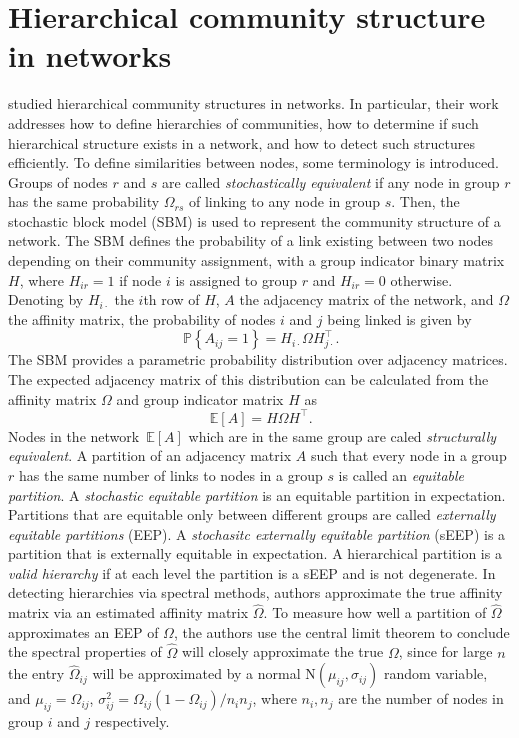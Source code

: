 \documentclass[letterpaper, 10 pt, conference]{article}
\newcommand\pr[1]{\, \mathbb{P} \left\lbrace #1 \right\rbrace}
\newcommand\expec[1]{\, \mathbb{E} \left\lbrack #1 \right\rbrack}
\begin{document}
\section{Hierarchical community structure in networks}\label{section:community}
\citet{schaub2020hierarchical} studied hierarchical community structures in networks. In particular, their work addresses how to define hierarchies of communities, how to determine if such hierarchical structure exists in a network, and how to detect such structures efficiently. To define similarities between nodes, some terminology is introduced. Groups of nodes $r$ and $s$ are called \textit{stochastically equivalent} if any node in group $r$ has the same probability $\Omega_{rs}$ of linking to any node in group $s$. Then, the stochastic block model (SBM) is used to represent the community structure of a network. The SBM defines the probability of a link existing between two nodes depending on their community assignment, with a group indicator binary matrix $H$, where $H_{ir} = 1$ if node $i$ is assigned to group $r$ and $H_{ir} = 0$ otherwise. Denoting by $H_{i \cdot}$ the $i$th row of $H$, $A$ the adjacency matrix of the network, and $\Omega$ the affinity matrix,  the probability of nodes $i$ and $j$ being linked is given by 
\begin{equation}
\pr{A_{ij} = 1} = H_{i \cdot} \Omega H_{j \cdot}^{\top}.
\end{equation}
The SBM provides a parametric probability distribution over adjacency matrices. The expected adjacency matrix of this distribution can be calculated from the affinity matrix $\Omega$ and group indicator matrix $H$ as 
\begin{equation}
	\expec{A} = H \Omega H^\top.
\end{equation}
Nodes in the network $\expec{A}$ which are in the same group are caled \textit{structurally equivalent}.  A partition of an adjacency matrix $A$ such that every node in a group $r$ has the same number of links to nodes in a group $s$ is called an \textit{equitable partition}.  A \textit{stochastic equitable partition} is an equitable partition in expectation. Partitions that are equitable only between different groups are called \textit{externally equitable partitions} (EEP). A \textit{stochasitc externally equitable partition} (sEEP) is a partition that is externally equitable in expectation.  A hierarchical partition is a \textit{valid hierarchy} if at each level the partition is a sEEP and is not degenerate.  
In detecting hierarchies via spectral methods, authors approximate the true affinity matrix via an estimated affinity matrix $\hat{\Omega}$.
To measure how well a partition of $\hat{\Omega}$ approximates an EEP of $\Omega$, the authors use the central limit theorem to conclude the spectral properties of $\hat{\Omega}$ will closely approximate the true $\Omega$, since for large $n$ the entry $\hat{\Omega}_{ij}$ will be approximated by a normal $\mathrm{N}(\mu_{ij}, \sigma_{ij})$ random variable, and $\mu_{ij} = \Omega_{ij}$, $\sigma^{2}_{ij} = \Omega_{ij} (1-\Omega_{ij}) / n_i n_j$, where $n_i, n_j$ are the number of nodes in group $i$ and $j$ respectively.  
\end{document}
